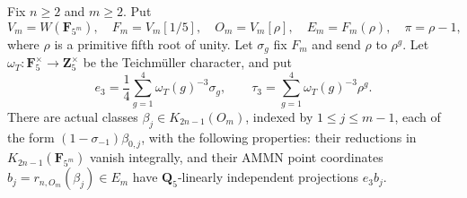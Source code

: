 \begin{lemma}
\label{d2ext:dimtwoVisibleHigherCoefficientRank}
Fix $n\geq2$ and $m\geq2$. Put
\[
 V_m=W(\mathbf F_{5^m}),\quad F_m=V_m[1/5],\quad
 O_m=V_m[\rho],\quad E_m=F_m(\rho),\quad \pi=\rho-1,
\]
where $\rho$ is a primitive fifth root of unity.
Let $\sigma_g$ fix $F_m$ and send $\rho$ to $\rho^g$.
Let $\omega_T:\mathbf F_5^\times\to\mathbf Z_5^\times$ be the
Teichm\"uller character, and put
\[
 e_3=\frac14\sum_{g=1}^4\omega_T(g)^{-3}\sigma_g,\qquad
 \tau_3=\sum_{g=1}^4\omega_T(g)^{-3}\rho^g.
\]
There are actual classes
$\beta_j\in K_{2n-1}(O_m)$, indexed by $1\leq j\leq m-1$, each of the form
$(1-\sigma_{-1})\beta_{0,j}$, with the following properties:
their reductions in $K_{2n-1}(\mathbf F_{5^m})$ vanish integrally,
and their AMMN point coordinates $b_j=r_{n,O_m}(\beta_j)\in E_m$
have $\mathbf Q_5$-linearly independent projections $e_3b_j$.
\end{lemma}

